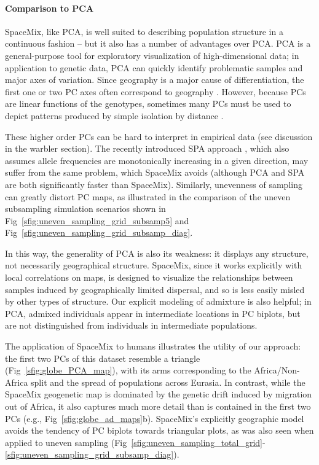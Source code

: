 \documentclass[10pt,letterpaper]{article}
\begin{document}
\paragraph{Comparison to PCA}
SpaceMix, like PCA, is well suited to describing population structure in a continuous fashion --
but it also has a number of advantages over PCA. 
PCA is a general-purpose tool for exploratory visualization of high-dimensional data;
in application to genetic data, PCA can quickly identify problematic samples and major axes of variation.  
Since geography is a major cause of differentiation, the first one or two PC axes often correspond to geography \cite{novembre_interpreting_2008}.  
However, because PCs are linear functions of the genotypes,
sometimes many PCs must be used to depict patterns produced by simple isolation by distance \cite{novembre_interpreting_2008}. 

These higher order PCs can be hard to interpret in empirical data (see discussion in the warbler section).
The recently introduced SPA approach \cite{yang_model-based_2012},
which also assumes allele frequencies are monotonically increasing in a given direction,
may suffer from the same problem, which SpaceMix avoids
(although PCA and SPA are both significantly faster than SpaceMix).  
Similarly, unevenness of sampling can greatly distort PC maps, 
as illustrated in the comparison of the uneven subsampling simulation scenarios 
shown in Fig\ \ref{sfig:uneven_sampling_grid_subsamp5} and Fig\ \ref{sfig:uneven_sampling_grid_subsamp_diag}.

In this way, the generality of PCA is also its weakness: 
it displays any structure, not necessarily geographical structure. 
SpaceMix, since it works explicitly with local correlations on maps, 
is designed to visualize the relationships between samples induced by geographically limited dispersal,
and so is less easily misled by other types of structure.
Our explicit modeling of admixture is also helpful; in PCA, admixed individuals appear in intermediate locations in PC biplots, 
but are not distinguished from individuals in intermediate populations.

The application of SpaceMix to humans illustrates the utility of our approach:
 the first two PCs of this dataset resemble a triangle (Fig\
\ref{sfig:globe_PCA_map}),
 with its arms corresponding to the Africa/Non-Africa split and the
spread of populations across Eurasia.
 In contrast, while the SpaceMix geogenetic map is dominated by the
genetic drift induced by migration out of Africa,
 it also captures much more detail than is contained in the first two
PCs (e.g., Fig\
\ref{sfig:globe_ad_maps}b).
SpaceMix's explicitly geographic model avoids the tendency of PC
biplots towards triangular plots,
as was also seen when applied to uneven sampling 
(Fig\ \ref{sfig:uneven_sampling_total_grid}-\ref{sfig:uneven_sampling_grid_subsamp_diag}).
\end{document}
